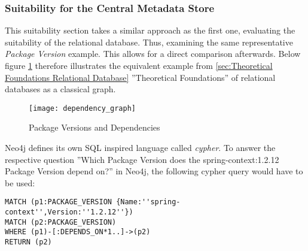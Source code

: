 \subsubsection{Suitability for the Central Metadata Store}
This suitability section takes a similar approach as the first one, evaluating the suitability of the relational database. Thus, examining the same representative \emph{Package Version} example. This allows for a direct comparison afterwards. Below figure \ref{fig:PackageVersionsAndDependenciesGraph} therefore illustrates the equivalent example from \ref{sec:Theoretical Foundations Relational Database} ''Theoretical Foundations'' of relational databases as a classical graph.

\begin{figure}[H]
	\centering
	\texttt{[image: dependency\_graph]}
	\caption[Package Versions and Dependencies as Graph]{Package Versions and Dependencies }
	\label{fig:PackageVersionsAndDependenciesGraph}
\end{figure}

Neo4j defines its own SQL inspired language called \emph{cypher}. To answer the respective question ''Which Package Version does the spring-context:1.2.12 Package Version depend on?'' in Neo4j, the following cypher query would have to be used:

\begin{lstlisting}[caption=Package Version Dependencies (including transitive), captionpos=b, label=lst:CypherTransitive]
MATCH (p1:PACKAGE_VERSION {Name:''spring-context'',Version:''1.2.12''})
MATCH (p2:PACKAGE_VERSION)
WHERE (p1)-[:DEPENDS_ON*1..]->(p2)
RETURN (p2)
\end{lstlisting}

